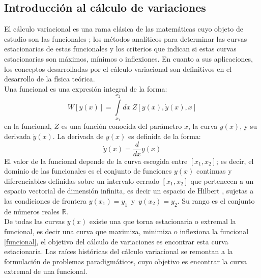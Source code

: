 \documentclass[a4paper,12pt]{article}
\begin{document}
\subsection{Introducción al cálculo de variaciones}
El cálculo variacional es una rama clásica de las matemáticas cuyo objeto de estudio son las funcionales \cite{funcional,ecudif,canada}; los métodos analíticos para determinar las curvas estacionarias de estas funcionales y los criterios que indican si estas curvas estacionarias son máximos, mínimos o inflexiones. En cuanto a sus aplicaciones, los conceptos desarrolladas por el cálculo variacional son definitivos en el desarrollo de la física teórica.
\\

Una funcional es una expresión integral de la forma:
\begin{equation}
W[y(x)]=\int\limits_{x_1}^{x_2}dx\ Z[y(x),\dot y(x),x]
\label{funcional}
\end{equation}
en la funcional, $Z$ es una función conocida del parámetro $x$, la curva $y(x)$, y su derivada $\dot y(x)$. La derivada de $y(x)$ es definida de la forma: 
\begin{equation}
\dot y(x)=\frac{d}{dx}y(x) 
\end{equation}
El valor de la funcional depende de la curva escogida entre $[x_1,x_2]$; es decir, el dominio de las funcionales es el conjunto de funciones $y(x)$ continuas y diferenciables definidas sobre un intervalo cerrado $[x_1,x_2]$ que pertenecen a un espacio vectorial de dimensión infinita, es decir un espacio de Hilbert \cite{hilbert}, sujetas a las condiciones de frontera \mbox{$y(x_1)=y_1$ y $y(x_2)=y_2$}. Su rango es el conjunto de números reales $\mathbb{R}$. 
\\

De todas las curvas $y(x)$ existe una que torna estacionaria o extremal la funcional, es decir una curva que maximiza, minimiza o inflexiona la funcional \eqref{funcional}, el objetivo del cálculo de variaciones es encontrar esta curva estacionaria. Las raíces históricas del cálculo variacional se remontan a la formulación de problemas paradigmáticos, cuyo objetivo es encontrar la curva extremal de una funcional.
\\
\end{document}
